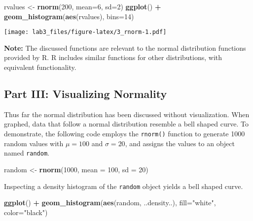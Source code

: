 \documentclass[]{article}
\newenvironment{Shaded}{\begin{snugshade}}{\end{snugshade}}
\newcommand{\KeywordTok}[1]{\textcolor[rgb]{0.13,0.29,0.53}{\textbf{#1}}}
\newcommand{\DataTypeTok}[1]{\textcolor[rgb]{0.13,0.29,0.53}{#1}}
\newcommand{\DecValTok}[1]{\textcolor[rgb]{0.00,0.00,0.81}{#1}}
\newcommand{\StringTok}[1]{\textcolor[rgb]{0.31,0.60,0.02}{#1}}
\newcommand{\OperatorTok}[1]{\textcolor[rgb]{0.81,0.36,0.00}{\textbf{#1}}}
\newcommand{\NormalTok}[1]{#1}
\begin{document}
\begin{Shaded}
\begin{Highlighting}[]
\NormalTok{rvalues <-}\StringTok{ }\KeywordTok{rnorm}\NormalTok{(}\DecValTok{200}\NormalTok{, }\DataTypeTok{mean=}\DecValTok{6}\NormalTok{, }\DataTypeTok{sd=}\DecValTok{2}\NormalTok{)}
\KeywordTok{ggplot}\NormalTok{() }\OperatorTok{+}
\StringTok{  }\KeywordTok{geom_histogram}\NormalTok{(}\KeywordTok{aes}\NormalTok{(rvalues), }\DataTypeTok{bins=}\DecValTok{14}\NormalTok{)}
\end{Highlighting}
\end{Shaded}

\texttt{[image: lab3\_files/figure-latex/3\_rnorm-1.pdf]}

\textbf{Note:} The discussed functions are relevant to the normal
distribution functions provided by R. R includes similar functions for
other distributions, with equivalent functionality.

\subsection{Part III: Visualizing
Normality}\label{part-iii-visualizing-normality}

Thus far the normal distribution has been discussed without
visualization. When graphed, data that follow a normal distribution
resemble a bell shaped curve. To demonstrate, the following code employs
the \texttt{rnorm()} function to generate 1000 random values with
\(\mu = 100\) and \(\sigma = 20\), and assigns the values to an object
named \texttt{random}.

\begin{Shaded}
\begin{Highlighting}[]
\NormalTok{random <-}\StringTok{ }\KeywordTok{rnorm}\NormalTok{(}\DecValTok{1000}\NormalTok{, }\DataTypeTok{mean =} \DecValTok{100}\NormalTok{, }\DataTypeTok{sd =} \DecValTok{20}\NormalTok{)}
\end{Highlighting}
\end{Shaded}

Inspecting a density histogram of the \texttt{random} object yields a
bell shaped curve.

\begin{Shaded}
\begin{Highlighting}[]
\KeywordTok{ggplot}\NormalTok{() }\OperatorTok{+}
\StringTok{  }\KeywordTok{geom_histogram}\NormalTok{(}\KeywordTok{aes}\NormalTok{(random, ..density..), }\DataTypeTok{fill=}\StringTok{"white"}\NormalTok{, }\DataTypeTok{color=}\StringTok{"black"}\NormalTok{)}
\end{Highlighting}
\end{Shaded}
\end{document}
